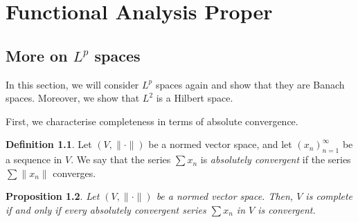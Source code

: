 \documentclass[a4paper, openany]{memoir}
\theoremstyle{definition}
\newtheorem{definition}{Definition}[section]
\theoremstyle{plain}
\newtheorem{proposition}[definition]{Proposition}
\begin{document}
    \chapter{Functional Analysis Proper}
    \section{More on $L^p$ spaces}
    In this section, we will consider $L^p$ spaces again and show that they are Banach spaces. Moreover, we show that $L^2$ is a Hilbert space.

    First, we characterise completeness in terms of absolute convergence.
    \begin{definition}
        Let $(V, \lVert \cdot \rVert)$ be a normed vector space, and let $(x_n)_{n=1}^\infty$ be a sequence in $V$. We say that the series $\sum x_n$ is \emph{absolutely convergent} if the series $\sum \lVert x_n \rVert$ converges.
    \end{definition}
    \begin{proposition}
        Let $(V, \lVert \cdot \rVert)$ be a normed vector space. Then, $V$ is complete if and only if every absolutely convergent series $\sum x_n$ in $V$ is convergent.
    \end{proposition}
\end{document}
